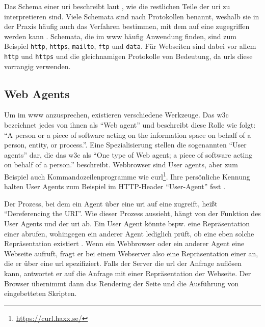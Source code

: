         Das Schema einer \gls{uri} beschreibt laut \cite[Kapitel 3.1]{rfc:3986},
        wie die restlichen Teile der \gls{uri} zu interpretieren sind.
        Viele Schemata sind nach Protokollen benannt,
        weshalb sie in der Praxis häufig auch das Verfahren bestimmen,
        mit dem auf eine {\resource} zugegriffen werden kann
        \cite[Kapitel 3.1]{w3c:wwwArch}.
        Schemata, die im \gls{www} häufig Anwendung finden,
        sind zum Beispiel
        \texttt{http},
        \texttt{https},
        \texttt{mailto},
        \texttt{ftp} und
        \texttt{data}.
        Für Webseiten sind dabei vor allem \texttt{http} und \texttt{https}
        und die gleichnamigen Protokolle von Bedeutung,
        da \glspl{url} diese vorrangig verwenden.

    \subsection{Web Agents}
        Um {\resources} im \gls{www} anzusprechen, existieren verschiedene Werkzeuge.
        Das \gls{w3c} \cite[Kapitel 6]{w3c:wwwArch} bezeichnet jedes von ihnen als
        "`Web agent"' und beschreibt diese Rolle wie folgt:
        "`A person or a piece of software acting on the information
        space on behalf of a person, entity, or process."'.
        Eine Spezialisierung stellen die sogenannten "`User agents"' dar,
        die das \gls{w3c} \cite[Kapitel 6]{w3c:wwwArch} als "`One type of Web agent;
        a piece of software acting on behalf of a person."' beschreibt.
        Webbrowser sind User agents, aber zum Beispiel auch Kommandozeilenprogramme
        wie curl\footnote{\url{https://curl.haxx.se/}}.
        Ihre persönliche Kennung halten User Agents zum Beispiel im
        HTTP-Header "`User-Agent"' fest \cite[Kapitel 5.5.3, Seite 46]{rfc:7231}.

        Der Prozess, bei dem ein Agent über eine \gls{uri} auf eine {\resource}
        zugreift, heißt "`Dereferencing the URI"'.
        Wie dieser Prozess aussieht, hängt von der Funktion des User Agents und der \gls{uri} ab.
        Ein User Agent könnte bspw. eine
        Repräsentation einer {\resource} abrufen, wohingegen ein anderer Agent
        lediglich prüft, ob eine eben solche Repräsentation existiert
        \cite[Kapitel 3.1]{w3c:wwwArch}.
        Wenn ein Webbrowser oder ein anderer Agent eine Webseite aufruft,
        fragt er bei einem Webserver also eine Repräsentation
        einer {\resource} an, die er über eine \gls{url} spezifiziert.
        Falls der Server die \gls{url} der Anfrage auflösen kann,
        antwortet er auf die Anfrage mit einer Repräsentation der Webseite.
        Der Browser übernimmt dann das Rendering der Seite und die Ausführung
        von eingebetteten Skripten.

